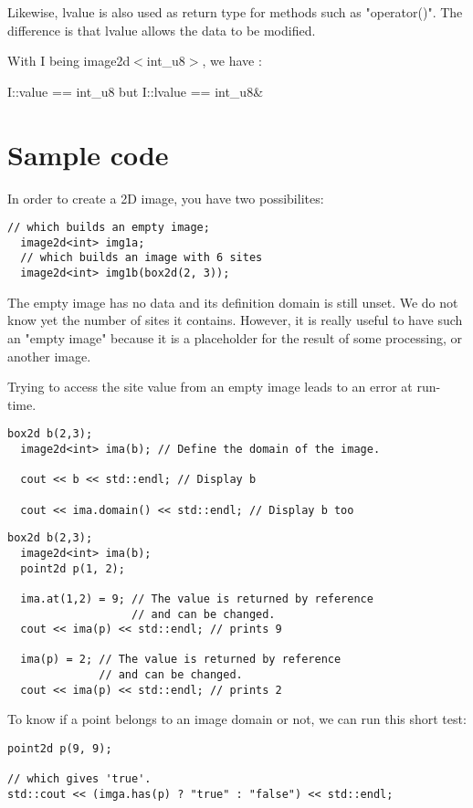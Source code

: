 \documentclass{report}
\begin{document}
Likewise, lvalue is also used as return type for methods such as "operator()".
The difference is that lvalue allows the data to be modified.

With I being image2d$<$int\_u8$>$, we have :

    I::value == int\_u8  but  I::lvalue == int\_u8\&


\section{Sample code}
In order to create a 2D image, you have two possibilites:
\begin{lstlisting}[frame=single]
  // which builds an empty image;
  image2d<int> img1a;
  // which builds an image with 6 sites
  image2d<int> img1b(box2d(2, 3));
\end{lstlisting}

The empty image has no data and its definition domain is still unset.  We do
not know yet the number of sites it contains. However, it is really useful to
have such an "empty image" because it is a placeholder for the result of some
processing, or another image.

Trying to access the site value from an empty image leads to an error at
run-time.


\begin{lstlisting}[frame=single]
  box2d b(2,3);
  image2d<int> ima(b); // Define the domain of the image.

  cout << b << std::endl; // Display b

  cout << ima.domain() << std::endl; // Display b too
\end{lstlisting}

\begin{lstlisting}[frame=single]
  box2d b(2,3);
  image2d<int> ima(b);
  point2d p(1, 2);

  ima.at(1,2) = 9; // The value is returned by reference
                   // and can be changed.
  cout << ima(p) << std::endl; // prints 9

  ima(p) = 2; // The value is returned by reference
              // and can be changed.
  cout << ima(p) << std::endl; // prints 2
\end{lstlisting}


To know if a point belongs to an image domain or not, we can run this short
test:
\begin{lstlisting}[frame=single]
point2d p(9, 9);

// which gives 'true'.
std::cout << (imga.has(p) ? "true" : "false") << std::endl;
\end{lstlisting}
\end{document}
